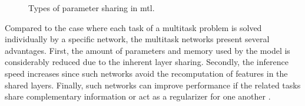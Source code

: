 \begin{figure}[ht]
\centering
{}
\hfill
{}    
\caption{Types of parameter sharing in \acl{mtl}.}
\label{fig:mtl_sharing}
\end{figure}

Compared to the case where each task of a multitask problem is solved individually by a specific network, the multitask networks present several advantages. First, the amount of parameters and memory used by the model is considerably reduced due to the inherent layer sharing. Secondly, the inference speed increases since such networks avoid the recomputation of features in the shared layers. Finally, such networks can improve performance if the related tasks share complementary information or act as a regularizer for one another \citep{vandenhende2021multi}. 



